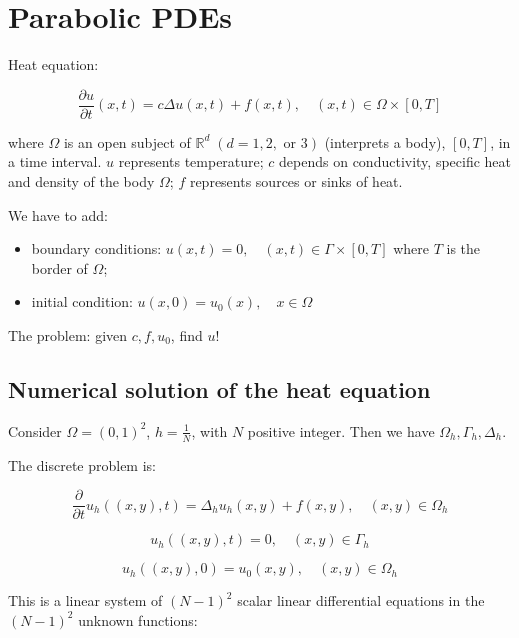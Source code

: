 \chapter{Parabolic PDEs}

Heat equation:

\begin{equation*}
\frac{\partial u}{\partial t} (x, t) = c \Delta u(x,t) + f(x, t), \quad (x, t) \in \Omega \times [0, T]
\end{equation*}

where $\Omega$ is an open subject of $\mathbb{R}^d \; (d = 1, 2, \text{ or } 3)$ (interprets a body), $[0, T]$, in a time interval.
$u$ represents temperature; $c$ depends on conductivity, specific heat and density of the body $\Omega$; $f$ represents sources or sinks of heat.

We have to add:
\begin{itemize}
	\item boundary conditions: $u(x, t)=0, \quad (x,t) \in \Gamma \times [0, T]$ where $T$ is the border of $\Omega$;
	\item initial condition: $u(x, 0) = u_0(x), \quad x \in \Omega$
\end{itemize}

The problem: given $c, f, u_0$, find $u$!

\section{Numerical solution of the heat equation}

Consider $\Omega = (0, 1)^2$, $h=\frac{1}{N}$, with $N$ positive integer.
Then we have $\Omega_h, \Gamma_h, \Delta_h$.

The discrete problem is:

\begin{equation*}
\frac{\partial}{\partial t} u_h((x, y), t) = \Delta_h u_h(x, y) + f(x, y),
\quad (x, y) \in \Omega_h
\end{equation*}

\begin{equation*}
u_h((x, y), t) = 0, \quad (x, y) \in \Gamma_h
\end{equation*}

\begin{equation*}
u_h((x,y), 0) = u_0(x, y), \quad (x, y) \in \Omega_h
\end{equation*}

This is a linear system of $(N-1)^2$ scalar linear differential equations in the $(N-1)^2$ unknown functions:

